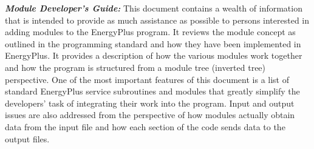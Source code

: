 \textbf{\emph{Module Developer's Guide:}} This document contains a wealth of information that is intended to provide as much assistance as possible to persons interested in adding modules to the EnergyPlus program. It reviews the module concept as outlined in the programming standard and how they have been implemented in EnergyPlus. It provides a description of how the various modules work together and how the program is structured from a module tree (inverted tree) perspective. One of the most important features of this document is a list of standard EnergyPlus service subroutines and modules that greatly simplify the developers' task of integrating their work into the program. Input and output issues are also addressed from the perspective of how modules actually obtain data from the input file and how each section of the code sends data to the output files.
